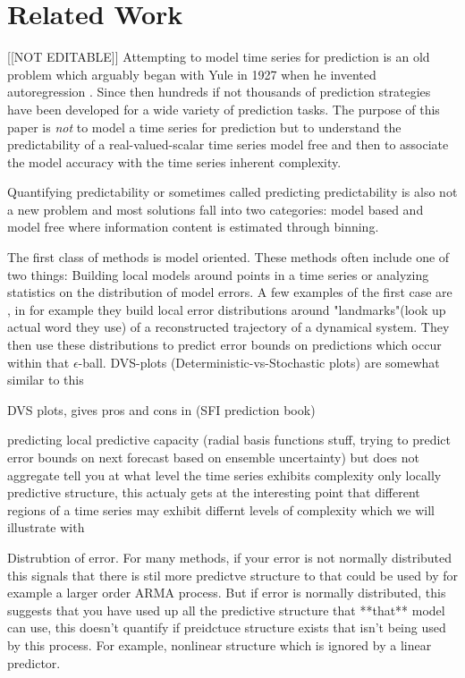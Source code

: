 \section{Related Work }\label{sec:related}
{\color{red}[[NOT EDITABLE]]}
Attempting to model time series for prediction is an  old problem which arguably began with Yule in 1927 when he invented autoregression \cite{Yule27}. Since then hundreds if not thousands of prediction strategies have been developed for a wide variety of prediction tasks. The purpose of this paper is \emph{not} to model a time series for prediction but to understand the predictability of a real-valued-scalar time series model free and then to associate the model accuracy with the time series inherent complexity. 

Quantifying predictability or sometimes called predicting predictability is also not a new problem and most solutions fall into two categories: model based and model free where information content is estimated through binning. 

The first class of methods is model oriented. These methods often include one of two things: Building local  models around points in a time series or analyzing statistics on the distribution of model errors. A few examples of the first case are \cite{Smith199250,dvsplots}, in \cite{Smith199250} for example they build local error distributions around "landmarks"(look up actual word they use) of a reconstructed trajectory of a dynamical system. They then use these distributions to predict error bounds on  predictions which occur within that $\epsilon$-ball. DVS-plots (Deterministic-vs-Stochastic plots) are somewhat similar to this 


DVS plots, gives pros and cons in (SFI prediction book)

predicting local predictive capacity (radial basis functions stuff, trying to predict error bounds on next forecast based on ensemble uncertainty) but does not aggregate tell you at what level the time series exhibits complexity only locally predictive structure, this actualy gets at the interesting point that different regions of a time series may exhibit differnt levels of complexity which we will illustrate with \svd

Distrubtion of error. For many methods, if your error is not normally distributed this signals that there is stil more predictve structure to that could be used by for example a larger order ARMA process. But if error is normally distributed, this suggests that you have used up all the predictive structure that **that** model can use, this doesn't quantify if preidctuce structure exists that isn't being used by this process. For example, nonlinear structure which is ignored by a linear predictor.





